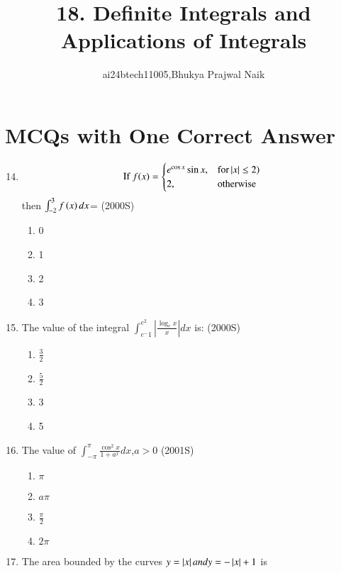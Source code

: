 \documentclass[journal,12pt,twocolumn]{IEEEtran}
\theoremstyle{remark}
\begin{document}

\vspace{3cm}

\title{18. Definite Integrals and Applications of Integrals}
\author{ai24btech11005,Bhukya Prajwal Naik}
\maketitle
\section{MCQs with One Correct Answer}

\begin{enumerate}
\setcounter{enumi}{13}   
\item
\begin{equation}
	\text{If } f(x) = 
\begin{cases}
	e^{\cos x}\sin x, & \text{for} \left\vert x\right\vert \leq 2)\\
	2, & \text{otherwise}\\
\end{cases}
\end{equation}
then $\int_{-2}^{3}f\left(x\right) dx$=
		\hfill(2000S)
\begin{enumerate}
    \item 0
    \item 1
    \item 2
    \item 3
\end{enumerate}
\item The value of the integral $\int_{e^-1}^{e^2}\left|\frac{\log_e x}{x}\right| dx$ is:
	\hfill(2000S)
\begin{enumerate}
	\item $\frac{3}{2}$
	\item $\frac{5}{2}$
    \item  3
    \item  5
\end{enumerate}
\item The value of $\int_{-\pi}^{\pi}\frac{\cos^2 x}{1+a^ x } dx$,$a>0$
	\hfill(2001S)
\begin{enumerate}
    \item$\pi$
    \item $a\pi$
    \item $\frac{\pi}{2}$
    \item $2\pi$
\end{enumerate}
\item The area bounded by the curves $y=\left\vert x\right\vert and y=-\left\vert x\right\vert+1$ is

\end{enumerate}
\end{document}
